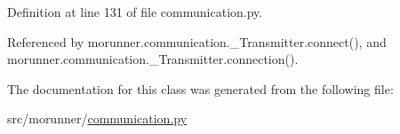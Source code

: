 Definition at line 131 of file communication.\+py.



Referenced by morunner.\+communication.\+\_\+\+Transmitter.\+connect(), and morunner.\+communication.\+\_\+\+Transmitter.\+connection().



The documentation for this class was generated from the following file\+:\begin{DoxyCompactItemize}
\item 
src/morunner/\hyperlink{communication_8py}{communication.\+py}\end{DoxyCompactItemize}
